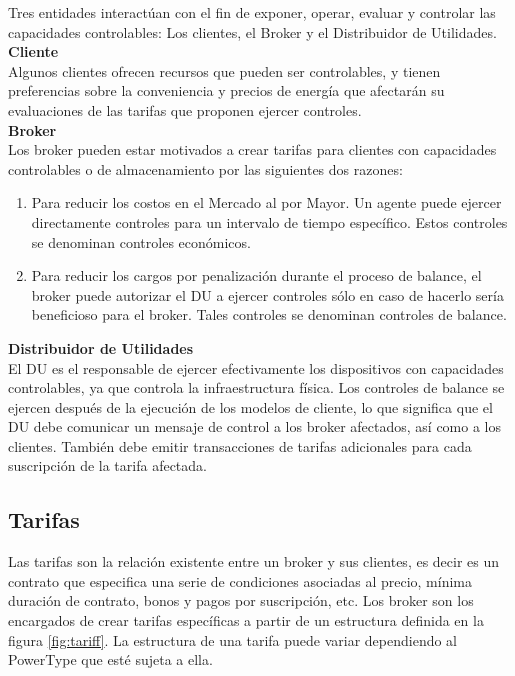 Tres entidades interactúan con el fin de exponer, operar, evaluar y controlar las capacidades controlables: Los clientes, el Broker y el Distribuidor de Utilidades.\\

\textbf{Cliente}\\

Algunos clientes ofrecen recursos que pueden ser controlables, y tienen preferencias sobre la conveniencia y precios de energía que afectarán su evaluaciones de las tarifas que proponen ejercer controles.\\

\textbf{Broker}\\

Los broker pueden estar motivados a crear tarifas para clientes con capacidades controlables o de almacenamiento por las siguientes dos razones:

\begin{enumerate}
	\item Para reducir los costos en el Mercado al por Mayor. Un agente puede ejercer directamente controles para un intervalo de tiempo específico. Estos controles se denominan controles económicos.
	\item Para reducir los cargos por penalización durante el proceso de balance, el broker puede autorizar el DU a ejercer controles sólo en caso de hacerlo sería beneficioso para el broker. Tales controles se denominan controles de balance.
\end{enumerate}

\textbf{Distribuidor de Utilidades}\\

El DU es el responsable de ejercer efectivamente los dispositivos con capacidades controlables, ya que controla la infraestructura física. Los controles de balance se ejercen después de la ejecución de los modelos de cliente, lo que significa que el DU debe comunicar un mensaje de control a los broker afectados, así como a los clientes. También debe emitir transacciones de tarifas adicionales para cada suscripción de la tarifa afectada.

\subsection{Tarifas} \label{sec:tariff}
Las tarifas son la relación existente entre un broker y sus clientes, es decir es un contrato que especifica una serie de condiciones asociadas al precio, mínima duración de contrato, bonos y pagos por suscripción, etc. Los broker son los encargados de crear tarifas específicas a partir de un estructura definida  en la figura \ref{fig:tariff}. La estructura de una tarifa puede variar dependiendo al PowerType que esté sujeta a ella.

